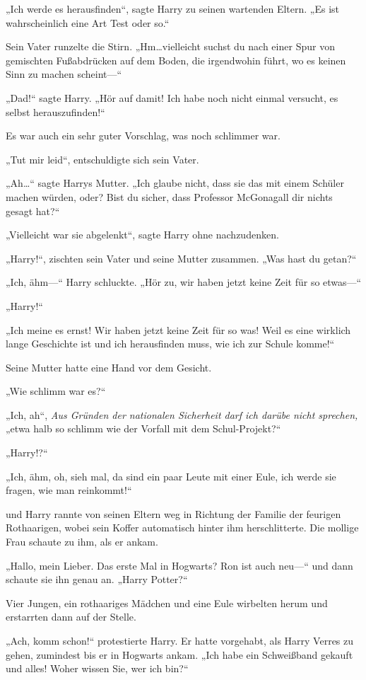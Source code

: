 {„Ich werde es herausfinden“, sagte Harry zu seinen wartenden Eltern. „Es ist wahrscheinlich eine Art Test oder so.“

Sein Vater runzelte die Stirn. „Hm…vielleicht suchst du nach einer Spur von gemischten Fußabdrücken auf dem Boden, die irgendwohin führt, wo es keinen Sinn zu machen scheint—“

„Dad!“ sagte Harry. „Hör auf damit! Ich habe noch nicht einmal versucht, es selbst herauszufinden!“

Es war auch ein sehr guter Vorschlag, was noch schlimmer war.

„Tut mir leid“, entschuldigte sich sein Vater.

„Ah…“ sagte Harrys Mutter. „Ich glaube nicht, dass sie das mit einem Schüler machen würden, oder? Bist du sicher, dass Professor McGonagall dir nichts gesagt hat?“

„Vielleicht war sie abgelenkt“, sagte Harry ohne nachzudenken.

„Harry!“, zischten sein Vater und seine Mutter zusammen. „Was hast du getan?“

„Ich, ähm—“ Harry schluckte. „Hör zu, wir haben jetzt keine Zeit für so etwas—“

„Harry!“

„Ich meine es ernst! Wir haben jetzt keine Zeit für so was! Weil es eine wirklich lange Geschichte ist und ich herausfinden muss, wie ich zur Schule komme!“

Seine Mutter hatte eine Hand vor dem Gesicht.

„Wie schlimm war es?“

„Ich, ah“, \emph{Aus Gründen der nationalen Sicherheit darf ich darübe nicht sprechen,} „etwa halb so schlimm wie der Vorfall mit dem Schul-Projekt?“

„Harry!?“

„Ich, ähm, oh, sieh mal, da sind ein paar Leute mit einer Eule, ich werde sie fragen, wie man reinkommt!“

und Harry rannte von seinen Eltern weg in Richtung der Familie der feurigen Rothaarigen, wobei sein Koffer automatisch hinter ihm herschlitterte. Die mollige Frau schaute zu ihm, als er ankam.

„Hallo, mein Lieber. Das erste Mal in Hogwarts? Ron ist auch neu—“ und dann schaute sie ihn genau an. „Harry Potter?“

Vier Jungen, ein rothaariges Mädchen und eine Eule wirbelten herum und erstarrten dann auf der Stelle.

„Ach, komm schon!“ protestierte Harry. Er hatte vorgehabt, als Harry Verres zu gehen, zumindest bis er in Hogwarts ankam. „Ich habe ein Schweißband gekauft und alles! Woher wissen Sie, wer ich bin?“

}
